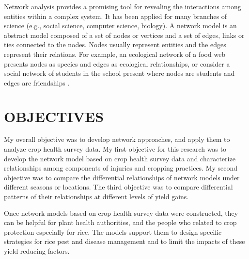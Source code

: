 Network analysis provides a promising tool for revealing the interactions among entities within a complex system. It has been applied for many branches of science (e.g., social science, computer science, biology). A network model is an abstract model composed of a set of nodes or vertices and a set of edges, links or ties connected to the nodes. Nodes usually represent entities and the edges represent their relations. For example, an ecological network of a food web presents nodes as species  and edges as ecological relationships, or consider a social network of students in the school present where nodes are students and edges are friendships .

\section*{OBJECTIVES}


My overall objective was to develop network approaches, and apply them to analyze crop health survey data. My first objective for this research was to develop the network model based on crop health survey data and characterize relationships among components of injuries and cropping practices. My second objective was to compare the differential relationships of network models under different seasons or locations. The third objective was to compare differential patterns of their relationships at different levels of yield gains.


Once network models based on crop health survey data were constructed, they can be helpful for plant health authorities, and the people who related to crop protection especially for rice. The models support them to design specific strategies for rice pest and disease management and to limit the impacts of these yield reducing factors.  

